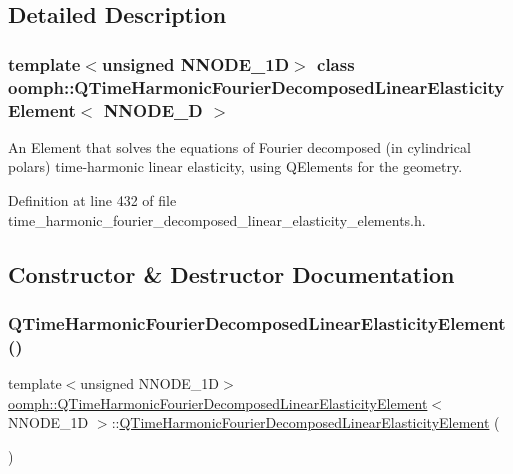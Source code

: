 \subsection{Detailed Description}
\subsubsection*{template$<$unsigned N\+N\+O\+D\+E\+\_\+1D$>$\newline
class oomph\+::\+Q\+Time\+Harmonic\+Fourier\+Decomposed\+Linear\+Elasticity\+Element$<$ N\+N\+O\+D\+E\+\_\+D $>$}

An Element that solves the equations of Fourier decomposed (in cylindrical polars) time-\/harmonic linear elasticity, using Q\+Elements for the geometry. 

Definition at line 432 of file time\+\_\+harmonic\+\_\+fourier\+\_\+decomposed\+\_\+linear\+\_\+elasticity\+\_\+elements.\+h.



\subsection{Constructor \& Destructor Documentation}
\mbox{\label{classoomph_1_1QTimeHarmonicFourierDecomposedLinearElasticityElement_a769163dd4ee891bb58b5cda26dda3f2c}} 
\subsubsection{\texorpdfstring{Q\+Time\+Harmonic\+Fourier\+Decomposed\+Linear\+Elasticity\+Element()}{QTimeHarmonicFourierDecomposedLinearElasticityElement()}}
{\footnotesize\ttfamily template$<$unsigned N\+N\+O\+D\+E\+\_\+1D$>$ \\
\hyperlink{classoomph_1_1QTimeHarmonicFourierDecomposedLinearElasticityElement}{oomph\+::\+Q\+Time\+Harmonic\+Fourier\+Decomposed\+Linear\+Elasticity\+Element}$<$ N\+N\+O\+D\+E\+\_\+1D $>$\+::\hyperlink{classoomph_1_1QTimeHarmonicFourierDecomposedLinearElasticityElement}{Q\+Time\+Harmonic\+Fourier\+Decomposed\+Linear\+Elasticity\+Element} (\begin{DoxyParamCaption}{ }\end{DoxyParamCaption})\hspace{0.3cm}{\ttfamily [inline]}}



